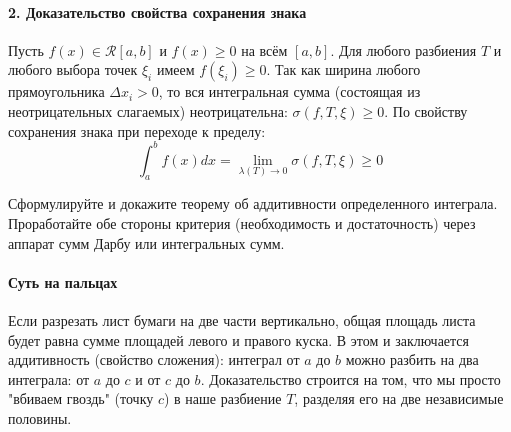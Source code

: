 \paragraph{2. Доказательство свойства сохранения знака}
Пусть $f(x) \in \mathcal{R}[a, b]$ и $f(x) \ge 0$ на всём $[a, b]$. 
Для любого разбиения $T$ и любого выбора точек $\xi_i$ имеем $f(\xi_i) \ge 0$. Так как ширина любого прямоугольника $\Delta x_i > 0$, то вся интегральная сумма (состоящая из неотрицательных слагаемых) неотрицательна: $\sigma(f, T, \xi) \ge 0$.
По свойству сохранения знака при переходе к пределу:
$$ \int_a^b f(x) dx = \lim_{\lambda(T)\to0} \sigma(f, T, \xi) \ge 0 $$


{Сформулируйте и докажите теорему об аддитивности определенного интеграла. Проработайте обе стороны критерия (необходимость и достаточность) через аппарат сумм Дарбу или интегральных сумм.}

\paragraph{Суть на пальцах}
Если разрезать лист бумаги на две части вертикально, общая площадь листа будет равна сумме площадей левого и правого куска. В этом и заключается аддитивность (свойство сложения): интеграл от $a$ до $b$ можно разбить на два интеграла: от $a$ до $c$ и от $c$ до $b$. Доказательство строится на том, что мы просто "вбиваем гвоздь" (точку $c$) в наше разбиение $T$, разделяя его на две независимые половины.

\vspace{0.5em}
\begin{center}
\end{center}
\vspace{0.5em}

